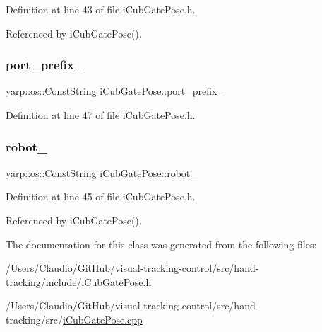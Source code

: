 Definition at line 43 of file i\+Cub\+Gate\+Pose.\+h.



Referenced by i\+Cub\+Gate\+Pose().

\mbox{\label{classiCubGatePose_a2e319d826c8683417b96d691f9d5fa58}} 
\subsubsection{\texorpdfstring{port\+\_\+prefix\+\_\+}{port\_prefix\_}}
{\footnotesize\ttfamily yarp\+::os\+::\+Const\+String i\+Cub\+Gate\+Pose\+::port\+\_\+prefix\+\_\+\hspace{0.3cm}{\ttfamily [private]}}



Definition at line 47 of file i\+Cub\+Gate\+Pose.\+h.

\mbox{\label{classiCubGatePose_a15e5113dc88ac3b411eaa33d60378b66}} 
\subsubsection{\texorpdfstring{robot\+\_\+}{robot\_}}
{\footnotesize\ttfamily yarp\+::os\+::\+Const\+String i\+Cub\+Gate\+Pose\+::robot\+\_\+\hspace{0.3cm}{\ttfamily [private]}}



Definition at line 45 of file i\+Cub\+Gate\+Pose.\+h.



Referenced by i\+Cub\+Gate\+Pose().



The documentation for this class was generated from the following files\+:\begin{DoxyCompactItemize}
\item 
/\+Users/\+Claudio/\+Git\+Hub/visual-\/tracking-\/control/src/hand-\/tracking/include/\hyperlink{iCubGatePose_8h}{i\+Cub\+Gate\+Pose.\+h}\item 
/\+Users/\+Claudio/\+Git\+Hub/visual-\/tracking-\/control/src/hand-\/tracking/src/\hyperlink{iCubGatePose_8cpp}{i\+Cub\+Gate\+Pose.\+cpp}\end{DoxyCompactItemize}
